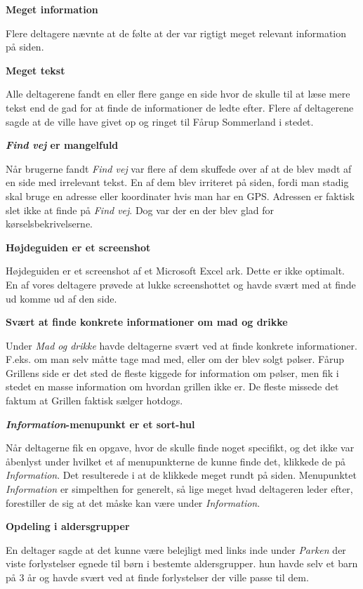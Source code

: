 \documentclass[10pt,a4paper]{article}      %
\newcommand\pic[1]{\texttt{[image: Pics/\#1]}}
\renewcommand\good{\pic{good}}
\renewcommand\goodidea{\pic{goodidea}}
\renewcommand\smallproblem{\pic{smallproblem}}
\renewcommand\seriousproblem{\pic{seriousproblem}}
\begin{document}
\begin{kommentarer}


\item[\good] \textbf{Meget information}

Flere deltagere nævnte at de følte at der var rigtigt meget relevant information på siden.

\item[\seriousproblem] \textbf{Meget tekst}

Alle deltagerene fandt en eller flere gange en side hvor de skulle til at læse mere tekst end de gad for at finde de informationer de ledte efter. Flere af deltagerene sagde at de ville have givet op og ringet til Fårup Sommerland i stedet.

\item[\smallproblem] \textbf{\emph{Find vej} er mangelfuld}

Når brugerne fandt \emph{Find vej} var flere af dem skuffede over af at de blev mødt af en side med irrelevant tekst. En af dem blev irriteret på siden, fordi man stadig skal bruge en adresse eller koordinater hvis man har en GPS. Adressen er faktisk slet ikke at finde på \emph{Find vej}. Dog var der en der blev glad for kørselsbekrivelserne.

\item[\smallproblem]{\textbf{Højdeguiden er et screenshot}}

Højdeguiden er et screenshot af et Microsoft Excel ark. Dette er ikke optimalt. En af vores deltagere prøvede at lukke screenshottet og havde svært med at finde ud komme ud af den side.

\item[\smallproblem] \textbf{Svært at finde konkrete informationer om mad og drikke}

Under \emph{Mad og drikke} havde deltagerne svært ved at finde konkrete informationer. F.eks. om man selv måtte tage mad med, eller om der blev solgt pølser. Fårup Grillens side er det sted de fleste kiggede for information om pølser, men fik i stedet en masse information om hvordan grillen ikke er. De fleste missede det faktum at Grillen faktisk sælger hotdogs.

\item[\seriousproblem]{\textbf{\emph{Information}-menupunkt er et sort-hul}}

Når deltagerne fik en opgave, hvor de skulle finde noget specifikt, og det ikke
var åbenlyst under hvilket et af menupunkterne de kunne finde det, klikkede de
på \emph{Information}. Det resulterede i at de klikkede meget rundt på siden.
Menupunktet \emph{Information} er simpelthen for generelt, så lige meget hvad
deltageren leder efter, forestiller de sig at det måske kan være under
\emph{Information}.

\item[\goodidea] \textbf{Opdeling i aldersgrupper}

En deltager sagde at det kunne være belejligt med links inde under \emph{Parken} der viste forlystelser egnede til børn i bestemte aldersgrupper. hun havde selv et barn på 3 år og havde svært ved at finde forlystelser der ville passe til dem.


\end{kommentarer}
\end{document}
